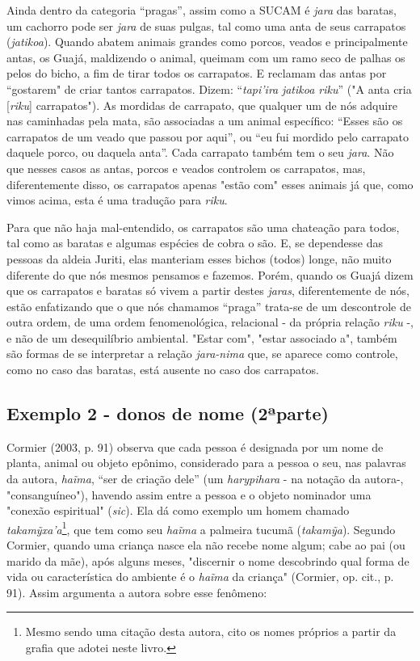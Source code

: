 Ainda dentro da categoria ``pragas'', assim como a SUCAM é \emph{jara}
das baratas, um cachorro pode ser \emph{jara} de suas pulgas, tal como
uma anta de seus carrapatos (\emph{jatikoa}). Quando abatem animais
grandes como porcos, veados e principalmente antas, os Guajá, maldizendo
o animal, queimam com um ramo seco de palhas os pelos do bicho, a fim de
tirar todos os carrapatos. E reclamam das antas por ``gostarem" de criar
tantos carrapatos. Dizem: ``\emph{tapi'ira} \emph{jatikoa riku}'' ("A
anta cria {[}\emph{riku}{]} carrapatos"). As mordidas de carrapato, que
qualquer um de nós adquire nas caminhadas pela mata, são associadas a um
animal específico: ``Esses são os carrapatos de um veado que passou por
aqui'', ou ``eu fui mordido pelo carrapato daquele porco, ou daquela
anta''. Cada carrapato também tem o seu \emph{jara}. Não que nesses
casos as antas, porcos e veados controlem os carrapatos, mas,
diferentemente disso, os carrapatos apenas "estão com" esses animais já
que, como vimos acima, esta é uma tradução para \emph{riku}.

Para que não haja mal-entendido, os carrapatos são uma chateação para
todos, tal como as baratas e algumas espécies de cobra o são. E, se
dependesse das pessoas da aldeia Juriti, elas manteriam esses bichos
(todos) longe, não muito diferente do que nós mesmos pensamos e fazemos.
Porém, quando os Guajá dizem que os carrapatos e baratas só vivem a
partir destes \emph{jaras}, diferentemente de nós, estão enfatizando que
o que nós chamamos ``praga'' trata-se de um descontrole de outra ordem,
de uma ordem fenomenológica, relacional - da própria relação \emph{riku}
-, e não de um desequilíbrio ambiental. "Estar com", "estar associado
a", também são formas de se interpretar a relação \emph{jara-nima} que,
se aparece como controle, como no caso das baratas, está ausente no caso
dos carrapatos.

\subsection{Exemplo 2 - donos de nome (2ªparte)}

Cormier (2003, p. 91) observa que cada pessoa é designada por um nome de
planta, animal ou objeto epônimo, considerado para a pessoa o seu, nas
palavras da autora, \emph{haĩma}, ``ser de criação dele'' (um
\emph{harypihara} - na notação da autora-, "consanguíneo"), havendo
assim entre a pessoa e o objeto nominador uma "conexão espiritual"
(\emph{sic}). Ela dá como exemplo um homem chamado
\emph{takamỹxa'a}\footnote{Mesmo sendo uma citação desta autora, cito os
  nomes próprios a partir da grafia que adotei neste livro.}, que tem
como seu \emph{haĩma} a palmeira tucumã (\emph{takamỹa}). Segundo
Cormier, quando uma criança nasce ela não recebe nome algum; cabe ao pai
(ou marido da mãe), após alguns meses, "discernir o nome descobrindo
qual forma de vida ou característica do ambiente é o \emph{haĩma} da
criança" (Cormier, op. cit., p. 91). Assim argumenta a autora sobre esse
fenômeno:

